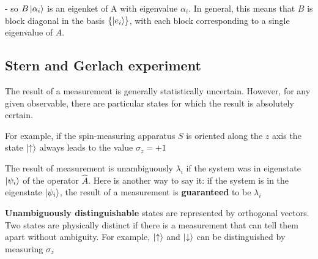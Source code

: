 \documentclass{article}
\begin{document}

- so $B \ket{\alpha_i}$ is an eigenket of A with eigenvalue $\alpha_i$. In general, this means that $B$ is block diagonal in the basis $\lbrace \ket{e_i} \rbrace$, with each block corresponding to a single eigenvalue of $A$.


\subsection{Stern and Gerlach experiment}




The result of a measurement is generally statistically uncertain. However, for any given observable, there are particular states for which the result is absolutely certain.



For example, if the spin-measuring apparatus $S$ is oriented along the $z$ axis the state $\ket{\uparrow}$ always leads to the value $\sigma_z = +1$

The result of measurement is unambiguously $\lambda_i$ if the system was in eigenstate $\ket{\psi_i}$ of the operator $\hat{A}$. Here is another way to say it: if the system is in the eigenstate $\ket{\psi_i}$, the result of a measurement is \textbf{guaranteed} to be $\lambda_i$



\textbf{Unambiguously distinguishable} states are represented by orthogonal vectors. Two states are physically distinct
if there is a measurement that can tell them apart without ambiguity. For example, $\ket{\uparrow}$ and $\ket{\downarrow}$ can be distinguished by measuring $\sigma_z$ 
\end{document}
